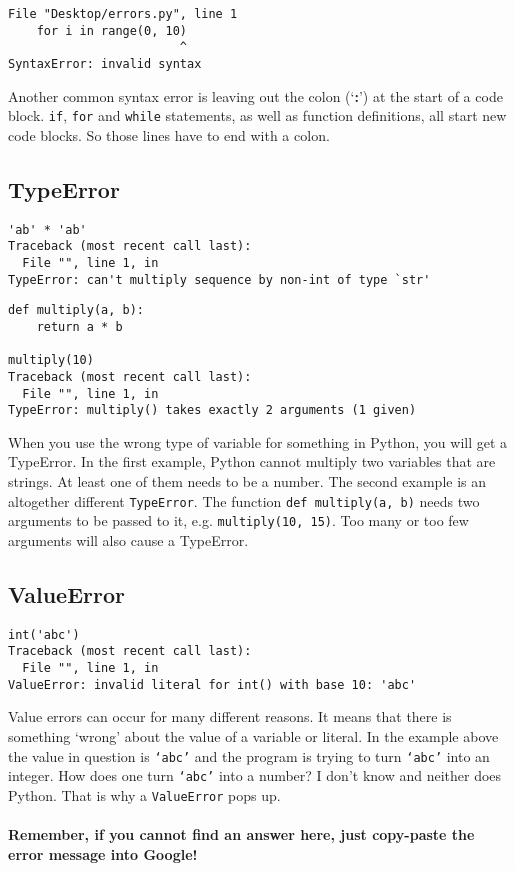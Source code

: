 \begin{lstlisting}
File "Desktop/errors.py", line 1
    for i in range(0, 10)
                        ^
SyntaxError: invalid syntax\end{lstlisting}

Another common syntax error is leaving out the colon (`\textbf{:}') at the start of a code block. \texttt{if}, \texttt{for} and \texttt{while} statements, as well as function                 definitions, all start new code blocks. So those lines have to end with a colon.

\subsection{TypeError}

\begin{lstlisting}
'ab' * 'ab'
Traceback (most recent call last):
  File "", line 1, in 
TypeError: can't multiply sequence by non-int of type `str'
\end{lstlisting}
\begin{lstlisting}
def multiply(a, b):
    return a * b

multiply(10)
Traceback (most recent call last):
  File "", line 1, in 
TypeError: multiply() takes exactly 2 arguments (1 given)\end{lstlisting}

When you use the wrong type of variable for something in Python, you will get a TypeError. In the first example, Python                 cannot multiply two variables that are strings. At least one of them needs to be a number. The second example is an altogether                 different \texttt{TypeError}. The function 
\texttt{def multiply(a, b)} needs two arguments to be passed to it, e.g. 
\texttt{multiply(10, 15)}.                 Too many or too few arguments will also cause a TypeError.

\subsection{ValueError}

\begin{lstlisting}
int('abc')
Traceback (most recent call last):
  File "", line 1, in 
ValueError: invalid literal for int() with base 10: 'abc'\end{lstlisting}

Value errors can occur for many different reasons. It means that there is something `wrong' about the value of a variable or                  literal. In the example above the value in question is \texttt{`abc'} and the program is trying to turn \texttt{`abc'} into an integer. How does one                 turn \texttt{`abc'} into a number? I don't know and neither does Python. That is why a \texttt{ValueError} pops up.
\\ \\
\textbf{Remember, if you cannot find an answer here, just copy-paste the error message into Google!} 
